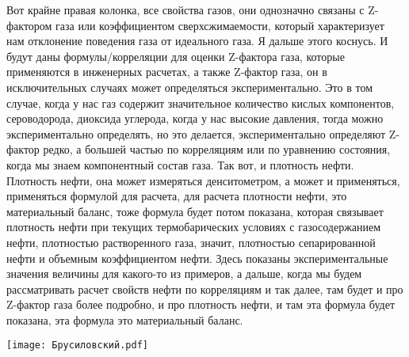 \documentclass[main.tex]{subfiles}
\begin{document}
Вот крайне правая колонка, все свойства газов, они однозначно связаны с Z-фактором газа или коэффициентом сверхсжимаемости, который характеризует нам отклонение поведения газа от идеального газа.
Я дальше этого коснусь.
И будут даны формулы/корреляции для оценки Z-фактора газа, которые применяются в инженерных расчетах, а также Z-фактор газа, он в исключительных случаях может определяться экспериментально.
Это в том случае, когда у нас газ содержит значительное количество кислых компонентов, сероводорода, диоксида углерода, когда у нас высокие давления, тогда можно экспериментально определять, но это делается, экспериментально определяют Z-фактор редко, а большей частью по корреляциям или по уравнению состояния, когда мы знаем компонентный состав газа.
Так вот, и плотность нефти.
Плотность нефти, она может измеряться денситометром, а может и применяться, применяться формулой для расчета, для расчета плотности нефти, это материальный баланс, тоже формула будет потом показана, которая связывает плотность нефти при текущих термобарических условиях с газосодержанием нефти, плотностью растворенного газа, значит, плотностью сепарированной нефти и объемным коэффициентом нефти.
Здесь показаны экспериментальные значения величины для какого-то из примеров, а дальше, когда мы будем рассматривать расчет свойств нефти по корреляциям и так далее, там будет и про Z-фактор газа более подробно, и про плотность нефти, и там эта формула будет показана, эта формула это материальный баланс.

\begin{center}
\texttt{[image: Брусиловский.pdf]}
\end{center}
\end{document}
